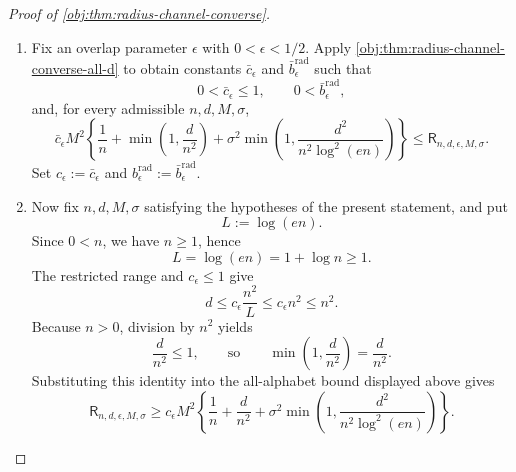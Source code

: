 \begin{proof}[Proof of \cref{obj:thm:radius-channel-converse}]
\begin{enumerate}
\item Fix an overlap parameter \(\epsilon\) with \(0<\epsilon<1/2\).  Apply \cref{obj:thm:radius-channel-converse-all-d} to obtain constants \(\bar c_{\epsilon}\) and \(\bar b_{\epsilon}^{\mathrm{rad}}\) such that
\[
0<\bar c_{\epsilon}\le 1,
\qquad
0<\bar b_{\epsilon}^{\mathrm{rad}},
\]
and, for every admissible \(n,d,M,\sigma\),
\[
\bar c_{\epsilon}M^2
\left\{
\frac1n+\min\left(1,\frac d{n^2}\right)
+\sigma^2
\min\left(1,\frac{d^2}{n^2\log^2(en)}\right)
\right\}
\le
\mathsf R_{n,d,\epsilon,M,\sigma}.
\]
Set \(c_{\epsilon}:=\bar c_{\epsilon}\) and
\(b_{\epsilon}^{\mathrm{rad}}:=\bar b_{\epsilon}^{\mathrm{rad}}\). %

\item Now fix \(n,d,M,\sigma\) satisfying the hypotheses of the present statement, and put
\[
L:=\log(en).
\]
Since \(0<n\), we have \(n\ge1\), hence
\[
L=\log(e n)=1+\log n\ge1.
\]
The restricted range and \(c_{\epsilon}\le1\) give
\[
d\le c_{\epsilon}\frac{n^2}{L}
\le c_{\epsilon}n^2
\le n^2 .
\]
Because \(n>0\), division by \(n^2\) yields
\[
\frac d{n^2}\le1,
\qquad\text{so}\qquad
\min\left(1,\frac d{n^2}\right)=\frac d{n^2}.
\]
Substituting this identity into the all-alphabet bound displayed above gives
\[
\mathsf R_{n,d,\epsilon,M,\sigma}
\ge
c_{\epsilon}M^2
\left\{
\frac1n+\frac d{n^2}
+\sigma^2
\min\left(1,\frac{d^2}{n^2\log^2(en)}\right)
\right\}.
\] %


\end{enumerate}
\end{proof}
